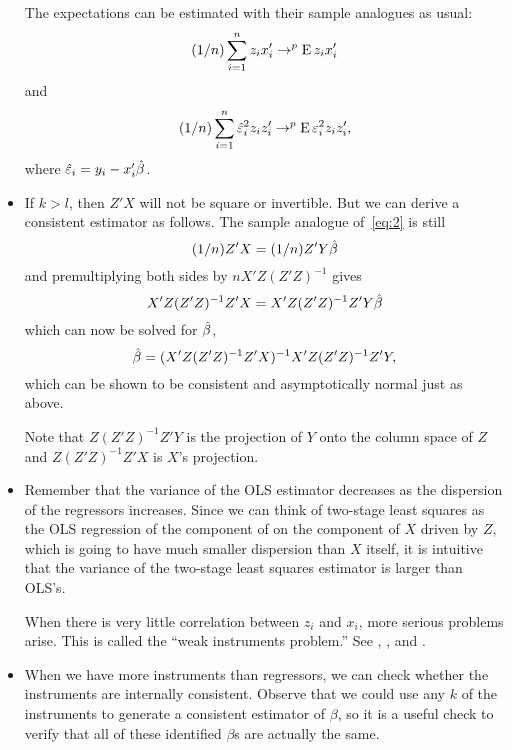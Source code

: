 \begin{itemize}[leftmargin=0pt]
  The expectations can be estimated with their sample analogues as
  usual:
  \begin{equation*}
    (1/n) \sum_{i=1}^n z_i x_i' \to^p \operatorname{E} z_i x_i'
  \end{equation*}
  and
  \begin{equation*}
    (1/n) \sum_{i=1}^n \hat{\varepsilon}_i^2 z_i z_i' \to^p \operatorname{E} \varepsilon_i^2 z_i z_i',
  \end{equation*}
  where $\hat{\varepsilon}_i = y_i - x_i'\hat{\beta}$.

\item If $k > l$, then $Z'X$ will not be square or invertible. But we can
  derive a consistent estimator as follows. The sample analogue
  of~\eqref{eq:2} is still
  \begin{equation*}
    (1/n) Z'X = (1/n) Z'Y\hat{\beta}
  \end{equation*}
  and premultiplying both sides by $n X'Z (Z'Z)^{-1}$ gives
  \begin{equation*}
    X'Z (Z'Z)^{-1} Z'X = X'Z (Z'Z)^{-1} Z'Y\hat{\beta}
  \end{equation*}
  which can now be solved for $\hat{\beta}$,
  \begin{equation*}
    \hat{\beta} = (X'Z (Z'Z)^{-1} Z'X)^{-1} X'Z (Z'Z)^{-1} Z'Y,
  \end{equation*}
  which can be shown to be consistent and asymptotically normal just
  as above.

  Note that $Z (Z'Z)^{-1} Z'Y$ is the projection of $Y$ onto the
  column space of $Z$ and $Z (Z'Z)^{-1} Z'X$ is $X$'s projection.

\item Remember that the variance of the OLS estimator decreases as the
  dispersion of the regressors increases. Since we can think of
  two-stage least squares as the OLS regression of the component of on
  the component of $X$ driven by $Z$, which is going to have much
  smaller dispersion than $X$ itself, it is intuitive that the
  variance of the two-stage least squares estimator is larger than
  OLS's.

  When there is very little correlation between $z_i$ and $x_i$, more
  serious problems arise. This is called the ``weak instruments problem.''
  See \citet{SS97}, \citet{SWY02}, and \citet{SY05}.

\item When we have more instruments than regressors, we can check
  whether the instruments are internally consistent. Observe that we
  could use any $k$ of the instruments to generate a consistent
  estimator of $\beta$, so it is a useful check to verify that all of
  these identified $\beta$s are actually the same.


\end{itemize}
